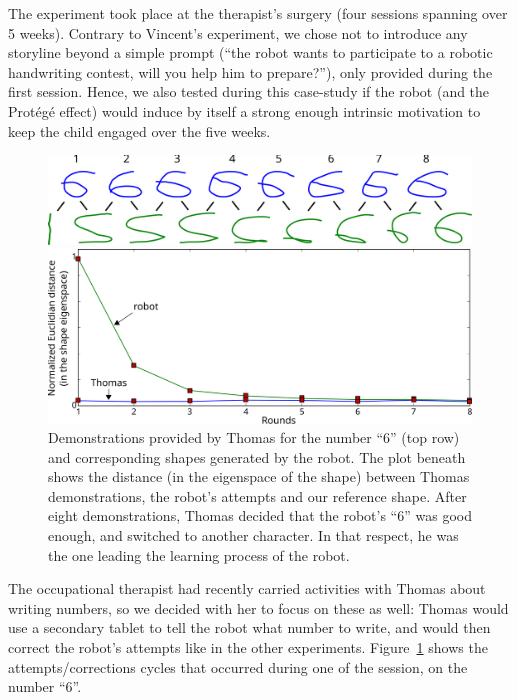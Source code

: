 \documentclass{article}
\begin{document}
The experiment took place at the therapist's surgery (four sessions spanning
over 5 weeks). Contrary to Vincent's experiment, we chose not to introduce any
storyline beyond a simple prompt (``the robot wants to participate to a robotic
handwriting contest, will you help him to prepare?''), only provided during the
first session. Hence, we also tested during this case-study if the robot (and
the Protégé effect) would induce by itself a strong enough intrinsic motivation to
keep the child engaged over the five weeks.

\begin{figure}
    \centering
    \includegraphics[width=0.9\linewidth]{learning_6_demos}

    \vspace{1em}

    \includegraphics[width=0.7\linewidth]{learning_6_distances}
    \caption{\small Demonstrations provided by Thomas for the number ``6'' (top row) and
        corresponding shapes generated by the robot. The plot beneath shows the distance
        (in the eigenspace of the shape) between Thomas demonstrations, the
        robot's attempts and our reference shape. After eight demonstrations,
        Thomas decided that the robot's ``6'' was good enough, and switched to
    another character. In that respect, he was the one leading the learning
process of the robot.}
    \label{learning_6_demos}
\end{figure}


The occupational therapist had recently carried activities with Thomas about
writing numbers, so we decided with her to focus on these as well: Thomas would
use a secondary tablet to tell the robot what number to write, and would then
correct the robot's attempts like in the other experiments.
Figure~\ref{learning_6_demos} shows the attempts/corrections cycles that
occurred during one of the session, on the number ``6''.
\end{document}
